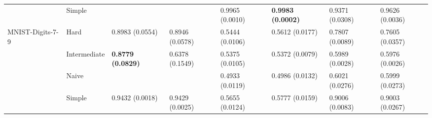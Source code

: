 \begin{tabular}{llllllll}
                 & Simple &                           &                           &           0.9965 (0.0010) &  \textbf{0.9983 (0.0002)} &           0.9371 (0.0308) &           0.9626 (0.0036) \\
MNIST-Digits-7-9 & Hard &           0.8983 (0.0554) &           0.8946 (0.0578) &           0.5444 (0.0106) &           0.5612 (0.0177) &           0.7807 (0.0089) &           0.7605 (0.0357) \\
                 & Intermediate &  \textbf{0.8779 (0.0829)} &           0.6378 (0.1549) &           0.5375 (0.0105) &           0.5372 (0.0079) &           0.5989 (0.0028) &           0.5976 (0.0026) \\
                 & Naive &                           &                           &           0.4933 (0.0119) &           0.4986 (0.0132) &           0.6021 (0.0276) &           0.5999 (0.0273) \\
                 & Simple &           0.9432 (0.0018) &           0.9429 (0.0025) &           0.5655 (0.0124) &           0.5777 (0.0159) &           0.9006 (0.0083) &           0.9003 (0.0267) \\
\bottomrule
\end{tabular}
